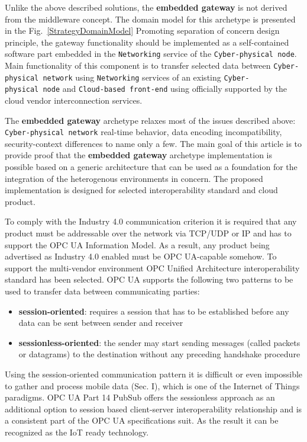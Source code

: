 \documentclass{jacsart}
\providecommand{\tightlist} { \setlength{\itemsep}{0pt}\setlength{\parskip}{0pt}}
\begin{document}
Unlike the above described solutions, the \textbf{embedded gateway} is
not derived from the middleware concept. The domain model for this
archetype is presented in the Fig.~\ref*{StrategyDomainModel} Promoting separation of concern
design principle, the gateway functionality should be implemented as a
self-contained software part embedded in the \texttt{Networking} service
of the \texttt{Cyber-physical\ node}. Main functionality of this
component is to transfer selected data between
\texttt{Cyber-physical\ network} using \texttt{Networking} services of
an existing \texttt{Cyber-physical\ node} and
\texttt{Cloud-based\ front-end} using officially supported by the cloud
vendor interconnection services.

The \textbf{embedded gateway} archetype relaxes most of the issues
described above: \texttt{Cyber-physical\ network} real-time behavior, data
encoding incompatibility, security-context differences to name only a
few. The main goal of this article is to provide proof that the
\textbf{embedded gateway} archetype implementation is possible based on
a generic architecture that can be used as a foundation for the
integration of the heterogenous environments in concern. The proposed
implementation is designed for selected interoperability standard and
cloud product.

To comply with the Industry 4.0 communication criterion it is required that any product must be addressable over the network via TCP/UDP or IP and has to support the OPC UA Information Model. As a result, any product being advertised as Industry 4.0 enabled must be OPC UA-capable somehow. To support the multi-vendor environment OPC Unified Architecture interoperability standard has been selected. OPC UA supports the following two patterns to be used to transfer data between communicating parties:

\begin{itemize}
  \tightlist
  \item \textbf{session-oriented}: requires a session that has to be established before any data can be sent between sender and receiver
  \item \textbf{sessionless-oriented}: the sender may start sending messages (called packets or datagrams) to the destination without any preceding handshake procedure
\end{itemize}

Using the session-oriented communication pattern it is difficult or
even impossible to gather and process mobile data (Sec. I), which is one
of the Internet of Things paradigms. OPC UA Part 14 PubSub \cite*{RefWorks:doc:5d98837de4b055984c0eecf0}  offers the sessionless approach as an additional option to session based client-server interoperability relationship and is a consistent part of the OPC UA specifications suit. As the result it can be recognized as the IoT ready technology.
\end{document}

